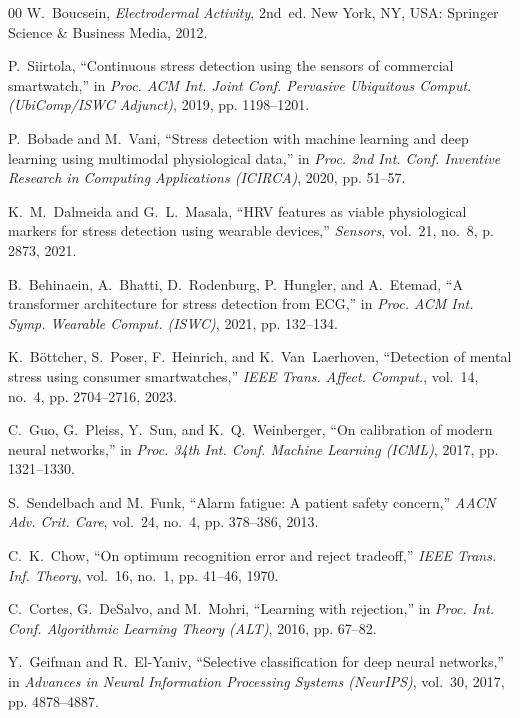 \documentclass[conference]{IEEEtran}
\begin{document}
\begin{thebibliography}{00}
W.~Boucsein, \textit{Electrodermal Activity}, 2nd~ed. New York, NY, USA: Springer Science \& Business Media, 2012.

P.~Siirtola, ``Continuous stress detection using the sensors of commercial smartwatch,'' in \textit{Proc. ACM Int. Joint Conf. Pervasive Ubiquitous Comput. (UbiComp/ISWC Adjunct)}, 2019, pp. 1198--1201.

P.~Bobade and M.~Vani, ``Stress detection with machine learning and deep learning using multimodal physiological data,'' in \textit{Proc. 2nd Int. Conf. Inventive Research in Computing Applications (ICIRCA)}, 2020, pp. 51--57.

K.~M.~Dalmeida and G.~L.~Masala, ``HRV features as viable physiological markers for stress detection using wearable devices,'' \textit{Sensors}, vol.~21, no.~8, p. 2873, 2021.

B.~Behinaein, A.~Bhatti, D.~Rodenburg, P.~Hungler, and A.~Etemad, ``A transformer architecture for stress detection from ECG,'' in \textit{Proc. ACM Int. Symp. Wearable Comput. (ISWC)}, 2021, pp. 132--134.

K.~B\"ottcher, S.~Poser, F.~Heinrich, and K.~Van~Laerhoven, ``Detection of mental stress using consumer smartwatches,'' \textit{IEEE Trans. Affect. Comput.}, vol.~14, no.~4, pp. 2704--2716, 2023.

C.~Guo, G.~Pleiss, Y.~Sun, and K.~Q.~Weinberger, ``On calibration of modern neural networks,'' in \textit{Proc. 34th Int. Conf. Machine Learning (ICML)}, 2017, pp. 1321--1330.

S.~Sendelbach and M.~Funk, ``Alarm fatigue: A patient safety concern,'' \textit{AACN Adv. Crit. Care}, vol.~24, no.~4, pp. 378--386, 2013.

C.~K.~Chow, ``On optimum recognition error and reject tradeoff,'' \textit{IEEE Trans. Inf. Theory}, vol.~16, no.~1, pp. 41--46, 1970.

C.~Cortes, G.~DeSalvo, and M.~Mohri, ``Learning with rejection,'' in \textit{Proc. Int. Conf. Algorithmic Learning Theory (ALT)}, 2016, pp. 67--82.

Y.~Geifman and R.~El-Yaniv, ``Selective classification for deep neural networks,'' in \textit{Advances in Neural Information Processing Systems (NeurIPS)}, vol.~30, 2017, pp. 4878--4887.


\end{thebibliography}
\end{document}
